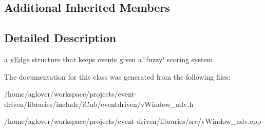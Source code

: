 \subsection*{Additional Inherited Members}


\subsection{Detailed Description}
a \hyperlink{classev_1_1vEdge}{v\+Edge} structure that keeps events given a \char`\"{}fuzzy\char`\"{} scoring system 

The documentation for this class was generated from the following files\+:\begin{DoxyCompactItemize}
\item 
/home/aglover/workspace/projects/event-\/driven/libraries/include/i\+Cub/eventdriven/v\+Window\+\_\+adv.\+h\item 
/home/aglover/workspace/projects/event-\/driven/libraries/src/v\+Window\+\_\+adv.\+cpp\end{DoxyCompactItemize}
